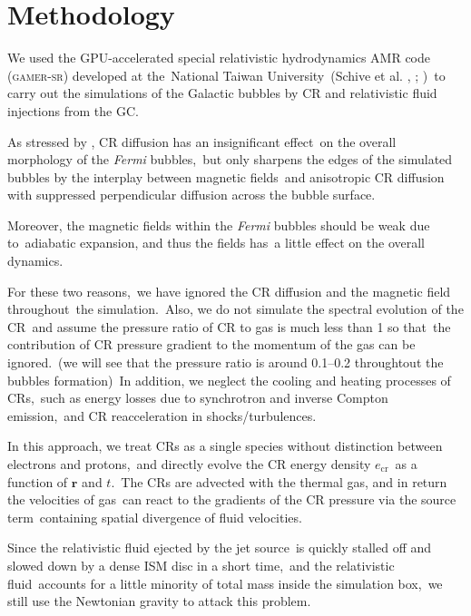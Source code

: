 \documentclass[twocolumn]{aastex631}
\begin{document}
\section{Methodology}
\label{Methodology}
  We used the GPU-accelerated special relativistic hydrodynamics AMR code (\textsc{gamer-sr}) developed at the\
  National Taiwan University\
  (Schive et al. \citeyear{gamer-1}, \citeyear{gamer-2}; \citeauthor{tseng2021} \citeyear{tseng2021})\
  to carry out the simulations of the Galactic bubbles by CR and relativistic fluid injections from the GC.

  As stressed by \citet{Yang2012}, CR diffusion has an insignificant effect\
  on the overall morphology of the \textit{Fermi} bubbles,\
  but only sharpens the edges of the simulated bubbles by the interplay between magnetic fields\
  and anisotropic CR diffusion with suppressed perpendicular diffusion across the bubble surface.

  Moreover, the magnetic fields within the \textit{Fermi} bubbles should be weak due to\
  adiabatic expansion, and thus the fields has\
  a little effect on the overall dynamics.

  For these two reasons,\
  we have ignored the CR diffusion and the magnetic field throughout\
  the simulation.\
  Also, we do not simulate the spectral evolution of the CR\
  and assume the pressure ratio of CR to gas is much less than 1 so that\
  the contribution of CR pressure gradient to the momentum of the gas can be ignored.\
  (we will see that the pressure ratio is around 0.1--0.2 throughtout the bubbles formation)\
  In addition, we neglect the cooling and heating processes of CRs,\
  such as energy losses due to synchrotron and inverse Compton emission,\
  and CR reacceleration in shocks/turbulences.

  In this approach, we treat CRs as a single species without distinction between electrons and protons,\
  and directly evolve the CR energy density $e_{\text{cr}}$\
  as a function of $\mathbf{r}$ and $t$.\
  The CRs are advected with the thermal gas, and in return the velocities of gas\
  can react to the gradients of the CR pressure via the source term\
  containing spatial divergence of fluid velocities.


  Since the relativistic fluid ejected by the jet source\
  is quickly stalled off and slowed down by a dense ISM disc in a short time,\
  and the relativistic fluid\
  accounts for a little minority of total mass inside the simulation box,\
  we still use the Newtonian gravity to attack this problem.
\end{document}
